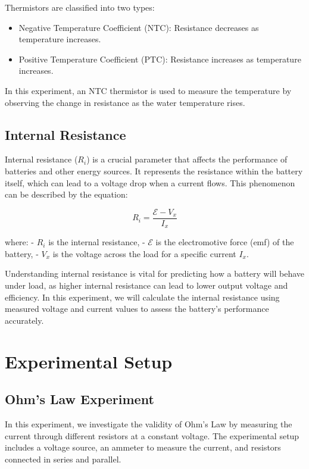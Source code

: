 \documentclass[journal]{IEEEtran}
\begin{document}
Thermistors are classified into two types:
\begin{itemize}
    \item Negative Temperature Coefficient (NTC): Resistance decreases as temperature increases.
    \item Positive Temperature Coefficient (PTC): Resistance increases as temperature increases.
\end{itemize}

In this experiment, an NTC thermistor is used to measure the temperature by observing the change in resistance as the water temperature rises.
\subsection{Internal Resistance}
Internal resistance (\( R_i \)) is a crucial parameter that affects the performance of batteries and other energy sources. It represents the resistance within the battery itself, which can lead to a voltage drop when a current flows. This phenomenon can be described by the equation:

\begin{equation}
    R_{i} = \frac{\mathcal{E} - V_x}{I_x}
    \label{eq:internal}
\end{equation}

where:
- \( R_i \) is the internal resistance,
- \( \mathcal{E} \) is the electromotive force (emf) of the battery,
- \( V_x \) is the voltage across the load for a specific current \( I_x \).

Understanding internal resistance is vital for predicting how a battery will behave under load, as higher internal resistance can lead to lower output voltage and efficiency. In this experiment, we will calculate the internal resistance using measured voltage and current values to assess the battery's performance accurately.

\section{Experimental Setup}
\subsection{Ohm's Law Experiment}
In this experiment, we investigate the validity of Ohm’s Law by measuring the current through different resistors at a constant voltage. The experimental setup includes a voltage source, an ammeter to measure the current, and resistors connected in series and parallel.
\end{document}
